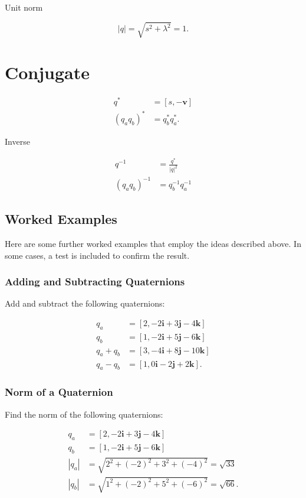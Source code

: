 \documentclass[10pt]{article}
\begin{document}
Unit norm

$$
|q|=\sqrt{s^{2}+\lambda^{2}}=1 .
$$

\section{Conjugate}
$$
\begin{aligned}
q^{*} & =[s,-\mathbf{v}] \\
\left(q_{a} q_{b}\right)^{*} & =q_{b}^{*} q_{a}^{*} .
\end{aligned}
$$

Inverse

$$
\begin{aligned}
q^{-1} & =\frac{q^{*}}{|q|^{2}} \\
\left(q_{a} q_{b}\right)^{-1} & =q_{b}^{-1} q_{a}^{-1}
\end{aligned}
$$

\subsection{Worked Examples}
Here are some further worked examples that employ the ideas described above. In some cases, a test is included to confirm the result.

\subsubsection{Adding and Subtracting Quaternions}
Add and subtract the following quaternions:

$$
\begin{aligned}
q_{a} & =[2,-2 \mathbf{i}+3 \mathbf{j}-4 \mathbf{k}] \\
q_{b} & =[1,-2 \mathbf{i}+5 \mathbf{j}-6 \mathbf{k}] \\
q_{a}+q_{b} & =[3,-4 \mathbf{i}+8 \mathbf{j}-10 \mathbf{k}] \\
q_{a}-q_{b} & =[1,0 \mathbf{i}-2 \mathbf{j}+2 \mathbf{k}] .
\end{aligned}
$$

\subsubsection{Norm of a Quaternion}
Find the norm of the following quaternions:

$$
\begin{aligned}
q_{a} & =[2,-2 \mathbf{i}+3 \mathbf{j}-4 \mathbf{k}] \\
q_{b} & =[1,-2 \mathbf{i}+5 \mathbf{j}-6 \mathbf{k}] \\
\left|q_{a}\right| & =\sqrt{2^{2}+(-2)^{2}+3^{2}+(-4)^{2}}=\sqrt{33} \\
\left|q_{b}\right| & =\sqrt{1^{2}+(-2)^{2}+5^{2}+(-6)^{2}}=\sqrt{66} .
\end{aligned}
$$
\end{document}
